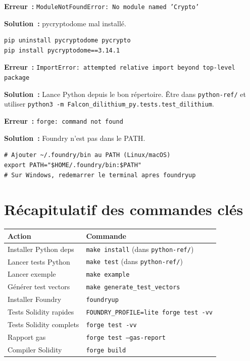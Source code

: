 \documentclass[12pt, a4paper]{article}
\begin{document}
\begin{errorbox}
\textbf{Erreur~:} \texttt{ModuleNotFoundError: No module named 'Crypto'}

\textbf{Solution~:} pycryptodome mal installé.
\begin{lstlisting}[style=bash]
pip uninstall pycryptodome pycrypto
pip install pycryptodome==3.14.1
\end{lstlisting}
\end{errorbox}

\begin{errorbox}
\textbf{Erreur~:} \texttt{ImportError: attempted relative import beyond top-level package}

\textbf{Solution~:} Lance Python depuis le bon répertoire.
Être dans \texttt{python-ref/} et utiliser \texttt{python3 -m Falcon\_dilithium\_py.tests.test\_dilithium}.
\end{errorbox}

\begin{errorbox}
\textbf{Erreur~:} \texttt{forge: command not found}

\textbf{Solution~:} Foundry n'est pas dans le PATH.
\begin{lstlisting}[style=bash]
# Ajouter ~/.foundry/bin au PATH (Linux/macOS)
export PATH="$HOME/.foundry/bin:$PATH"
# Sur Windows, redemarrer le terminal apres foundryup
\end{lstlisting}
\end{errorbox}

\section{Récapitulatif des commandes clés}

\begin{center}
\begin{tabular}{ll}
\toprule
\textbf{Action} & \textbf{Commande} \\
\midrule
Installer Python deps & \texttt{make install} (dans \texttt{python-ref/}) \\
Lancer tests Python & \texttt{make test} (dans \texttt{python-ref/}) \\
Lancer exemple & \texttt{make example} \\
Générer test vectors & \texttt{make generate\_test\_vectors} \\
Installer Foundry & \texttt{foundryup} \\
Tests Solidity rapides & \texttt{FOUNDRY\_PROFILE=lite forge test -vv} \\
Tests Solidity complets & \texttt{forge test -vv} \\
Rapport gas & \texttt{forge test --gas-report} \\
Compiler Solidity & \texttt{forge build} \\
\bottomrule
\end{tabular}
\end{center}
\end{document}
